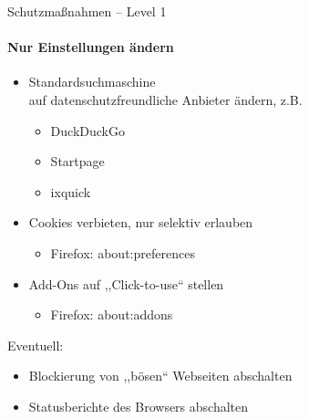   \begin{frame}{Schutzmaßnahmen -- Level 1}
  \framesubtitle{Nur Einstellungen ändern}
    \begin{itemize}
      \item Standardsuchmaschine\\ auf datenschutzfreundliche Anbieter ändern, z.B.
      \begin{itemize}
        \item DuckDuckGo
        \item Startpage
        \item ixquick
      \end{itemize}
      \item Cookies verbieten, nur selektiv erlauben
      \begin{itemize}
        \item Firefox: about:preferences
      \end{itemize}
      \item Add-Ons auf ,,Click-to-use`` stellen
      \begin{itemize}
        \item Firefox: about:addons
      \end{itemize}
    \end{itemize}

    Eventuell:
    \begin{itemize}
      \item Blockierung von ,,bösen`` Webseiten abschalten
      \item Statusberichte des Browsers abschalten
    \end{itemize}
  \end{frame}

